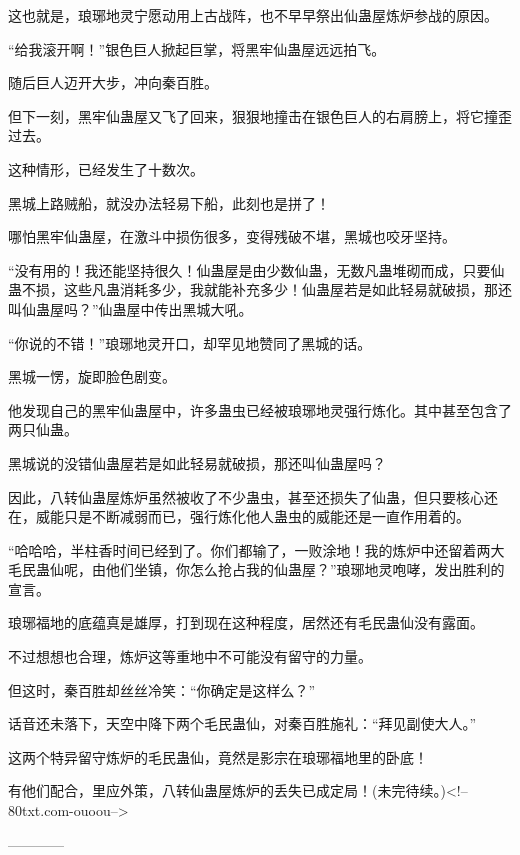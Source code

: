\begin{this_body}
这也就是，琅琊地灵宁愿动用上古战阵，也不早早祭出仙蛊屋炼炉参战的原因。

“给我滚开啊！”银色巨人掀起巨掌，将黑牢仙蛊屋远远拍飞。

随后巨人迈开大步，冲向秦百胜。

但下一刻，黑牢仙蛊屋又飞了回来，狠狠地撞击在银色巨人的右肩膀上，将它撞歪过去。

这种情形，已经发生了十数次。

黑城上路贼船，就没办法轻易下船，此刻也是拼了！

哪怕黑牢仙蛊屋，在激斗中损伤很多，变得残破不堪，黑城也咬牙坚持。

“没有用的！我还能坚持很久！仙蛊屋是由少数仙蛊，无数凡蛊堆砌而成，只要仙蛊不损，这些凡蛊消耗多少，我就能补充多少！仙蛊屋若是如此轻易就破损，那还叫仙蛊屋吗？”仙蛊屋中传出黑城大吼。

“你说的不错！”琅琊地灵开口，却罕见地赞同了黑城的话。

黑城一愣，旋即脸色剧变。

他发现自己的黑牢仙蛊屋中，许多蛊虫已经被琅琊地灵强行炼化。其中甚至包含了两只仙蛊。

黑城说的没错仙蛊屋若是如此轻易就破损，那还叫仙蛊屋吗？

因此，八转仙蛊屋炼炉虽然被收了不少蛊虫，甚至还损失了仙蛊，但只要核心还在，威能只是不断减弱而已，强行炼化他人蛊虫的威能还是一直作用着的。

“哈哈哈，半柱香时间已经到了。你们都输了，一败涂地！我的炼炉中还留着两大毛民蛊仙呢，由他们坐镇，你怎么抢占我的仙蛊屋？”琅琊地灵咆哮，发出胜利的宣言。

琅琊福地的底蕴真是雄厚，打到现在这种程度，居然还有毛民蛊仙没有露面。

不过想想也合理，炼炉这等重地中不可能没有留守的力量。

但这时，秦百胜却丝丝冷笑：“你确定是这样么？”

话音还未落下，天空中降下两个毛民蛊仙，对秦百胜施礼：“拜见副使大人。”

这两个特异留守炼炉的毛民蛊仙，竟然是影宗在琅琊福地里的卧底！

有他们配合，里应外策，八转仙蛊屋炼炉的丢失已成定局！(未完待续。)<!--80txt.com-ouoou-->

------------

\end{this_body}

